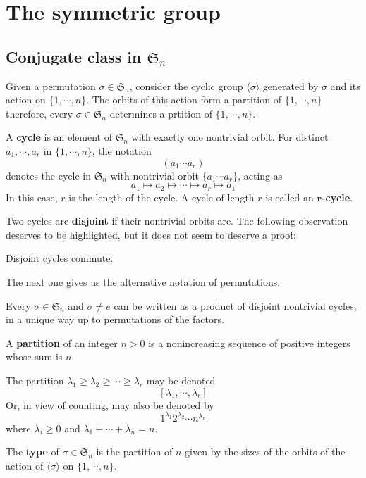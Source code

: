 \section{The symmetric group}
\subsection{Conjugate class in $\mathfrak{S}_n$}
Given a permutation $\sigma\in\mathfrak{S}_n$, consider the cyclic group $\langle\sigma\rangle$ generated by $\sigma$ and its action on $\{1,\cdots,n\}$. The orbits of this action form a partition of $\{1,\cdots,n\}$ therefore, every $\sigma\in\mathfrak{S}_n$ determines a prtition of $\{1,\cdots,n\}$.
\begin{definition}
A \textbf{cycle} is an element of $\mathfrak{S}_n$ with exactly one nontrivial
orbit. For distinct $a_1,\cdots,a_r$ in $\{1,\cdots,n\}$, the notation
\[(a_1\cdots a_r)\]
denotes the cycle in $\mathfrak{S}_n$ with nontrivial orbit $\{a_1\cdots a_r\}$, acting as
\[a_1\mapsto a_2\mapsto\cdots\mapsto a_r\mapsto a_1\]
In this case, $r$ is the length of the cycle. A cycle of length $r$ is called an \textbf{$\bm{r}$-cycle}.
\end{definition}
Two cycles are \textbf{disjoint} if their nontrivial orbits are. The following observation deserves to be highlighted, but it does not seem to deserve a proof:
\begin{lemma}
Disjoint cycles commute.
\end{lemma}
The next one gives us the alternative notation of permutations.
\begin{lemma}
Every $\sigma\in\mathfrak{S}_n$ and $\sigma\neq e$ can be written as a product of disjoint nontrivial cycles, in a unique way up to permutations of the factors.
\end{lemma}
\begin{definition}
A \textbf{partition} of an integer $n>0$ is a nonincreasing sequence of positive integers whose sum is $n$.\par
The partition $\lambda_1\geq\lambda_2\geq\cdots\geq\lambda_r$ may be denoted
\[[\lambda_1,\cdots,\lambda_r]\]
Or, in view of counting, may also be denoted by
\[1^{\lambda_1}2^{\lambda_2}\cdots n^{\lambda_n}\]
where $\lambda_i\geq 0$ and $\lambda_1+\cdots+\lambda_n=n$.
\end{definition}
\begin{definition}
The \textbf{type} of $\sigma\in\mathfrak{S}_n$ is the partition of $n$ given by the sizes of the orbits of the action of $\langle\sigma\rangle$ on $\{1,\cdots,n\}$.
\end{definition}
